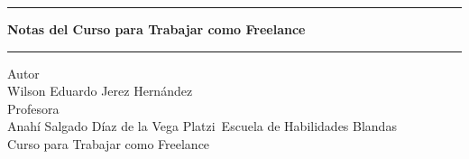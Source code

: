\pagestyle{empty}
\begin{center}
\begin{figure}[h]
\centering


\end{figure}
\Large
\hrule
\vspace{4mm}
\textbf{Notas del Curso para Trabajar como Freelance}\\

\vspace{4mm}
\hrule
\large
\vfill
Autor\\

Wilson Eduardo Jerez Hernández \\
\vfill
Profesora\\
Anahí Salgado Díaz de la Vega
\vfill
Platzi\
Escuela de Habilidades Blandas\\
Curso para Trabajar como Freelance\\
\end{center}
\newpage
